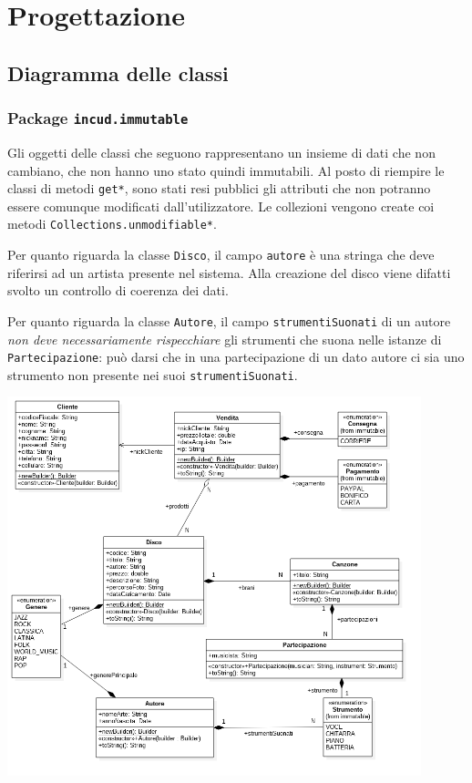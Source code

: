 \chapter{Progettazione}

\section{Diagramma delle classi}

\subsection{Package \texttt{incud.immutable}}
Gli oggetti delle classi che seguono rappresentano un insieme di dati che non cambiano, che non hanno uno stato quindi immutabili. Al posto di riempire le classi di metodi \texttt{get*}, sono stati resi pubblici gli attributi che non potranno essere comunque modificati dall'utilizzatore. Le collezioni vengono create coi metodi \texttt{Collections.unmodifiable*}.

Per quanto riguarda la classe \texttt{Disco}, il campo \texttt{autore} è una stringa che deve riferirsi ad un artista presente nel sistema. Alla creazione del disco viene difatti svolto un controllo di coerenza dei dati.

Per quanto riguarda la classe \texttt{Autore}, il campo \texttt{strumentiSuonati} di un autore \emph{non deve necessariamente rispecchiare} gli strumenti che suona nelle istanze di \texttt{Partecipazione}: può darsi che in una partecipazione di un dato autore ci sia uno strumento non presente nei suoi \texttt{strumentiSuonati}.

\begin{center}
    \includegraphics[width=0.9\textwidth]{diagram/classi-immutable.png}
\end{center}

